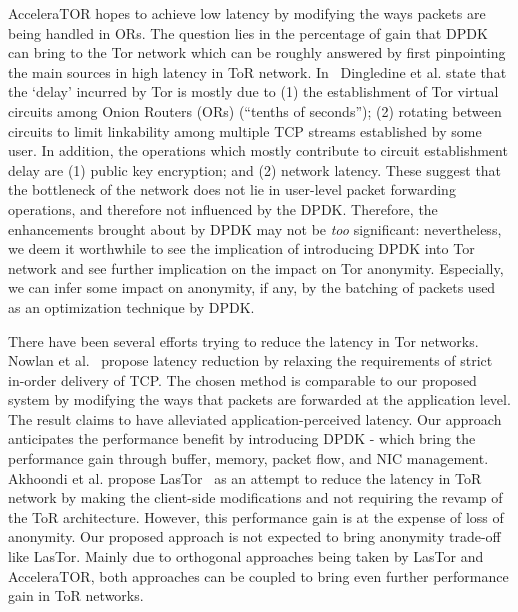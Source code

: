 \documentclass[conference]{IEEEtran}
\begin{document}
AcceleraTOR hopes to achieve low latency by modifying the ways packets are being handled in ORs. The question lies in the percentage of gain that DPDK can bring to the Tor network which can be roughly answered by first pinpointing the main sources in high latency in ToR network. In~\cite{Dingledine:2004:TSO:1251375.1251396} Dingledine et al. state that the `delay' incurred by Tor is mostly due to (1) the establishment of Tor virtual circuits among Onion Routers (ORs) (``tenths of seconds''); (2) rotating between circuits to limit linkability among multiple TCP streams established by some user. In addition, the operations which mostly contribute to circuit establishment delay are (1) public key encryption; and (2) network latency. These suggest that the bottleneck of the network does not lie in user-level packet forwarding operations, and therefore not influenced by the DPDK. Therefore, the enhancements brought about by DPDK may not be \textit{too} significant: nevertheless, we deem it worthwhile to see the implication of introducing DPDK into Tor network and see further implication on the impact on Tor anonymity. Especially, we can infer some impact on anonymity, if any, by the batching of packets used as an optimization technique by DPDK. 

There have been several efforts trying to reduce the latency in Tor networks. Nowlan et al.~\cite{179191} propose latency reduction by relaxing the requirements of strict in-order delivery of TCP. The chosen method is comparable to our proposed system by modifying the ways that packets are forwarded at the application level. The result claims to have alleviated application-perceived latency. Our approach anticipates the performance benefit by introducing DPDK - which bring the performance gain through buffer, memory, packet flow, and NIC management. Akhoondi et al. propose LasTor~\cite{Akhoondi:2012:LLA:2310656.2310712} as an attempt to reduce the latency in ToR network by making the client-side modifications and not requiring the revamp of the ToR architecture. However, this performance gain is at the expense of loss of anonymity. Our proposed  approach is not expected to bring anonymity trade-off like LasTor. Mainly due to orthogonal approaches being taken by LasTor and AcceleraTOR, both approaches can be coupled to bring even further performance gain in ToR networks. 
%
\end{document}
